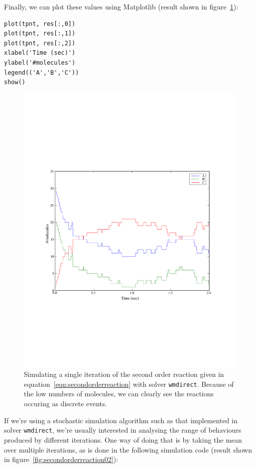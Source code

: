 \documentclass[a4paper,12pt]{book}
\begin{document}
Finally, we can plot these values using Matplotlib (result shown in figure~\ref{fig:secondorderreaction01}):
\begin{verbatim}
plot(tpnt, res[:,0])
plot(tpnt, res[:,1])
plot(tpnt, res[:,2])
xlabel('Time (sec)')
ylabel('#molecules')
legend(('A','B','C'))
show()
\end{verbatim}
\begin{figure}
\centering
\includegraphics[width=13cm]{secondorderreaction01.pdf}
\caption{Simulating a single iteration of the second order reaction given in equation~\ref{eqn:secondorderreaction} with solver \texttt{wmdirect}. Because of the low numbers of molecules, we can clearly see the reactions occuring as discrete events.}
\label{fig:secondorderreaction01}
\end{figure}

If we're using a stochastic simulation algorithm such as that implemented in solver \texttt{wmdirect}, we're usually interested in analysing the range of behaviours produced by different iterations. One way of doing that is by taking the mean over multiple iterations, as is done in the following simulation code (result shown in figure~\ref{fig:secondorderreaction02}):
\end{document}
